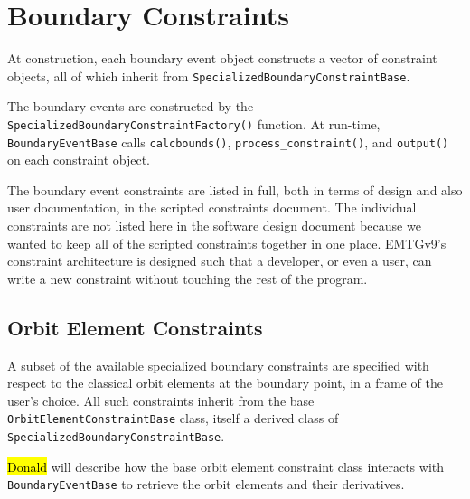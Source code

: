 \section{Boundary Constraints}
\label{sec:specialized_boundary_constraints}

At construction, each boundary event object constructs a vector of constraint objects, all of which inherit from \texttt{SpecializedBoundaryConstraintBase}. 

The boundary events are constructed by the \texttt{SpecializedBoundaryConstraintFactory()} function. At run-time, \texttt{BoundaryEventBase} calls \texttt{calcbounds()}, \texttt{process\_constraint()}, and \texttt{output()} on each constraint object.

The boundary event constraints are listed in full, both in terms of design and also user documentation, in the scripted constraints document. The individual constraints are not listed here in the software design document because we wanted to keep all of the scripted constraints together in one place. EMTGv9's constraint architecture is designed such that a developer, or even a user, can write a new constraint without touching the rest of the program.

\subsection{Orbit Element Constraints}
\label{subsec:boundary_orbit_element_constraints}

A subset of the available specialized boundary constraints are specified with respect to the classical orbit elements at the boundary point, in a frame of the user's choice. All such constraints inherit from the base \texttt{OrbitElementConstraintBase} class, itself a derived class of \texttt{SpecializedBoundaryConstraintBase}.

\hl{Donald} will describe how the base orbit element constraint class interacts with \texttt{BoundaryEventBase} to retrieve the orbit elements and their derivatives.